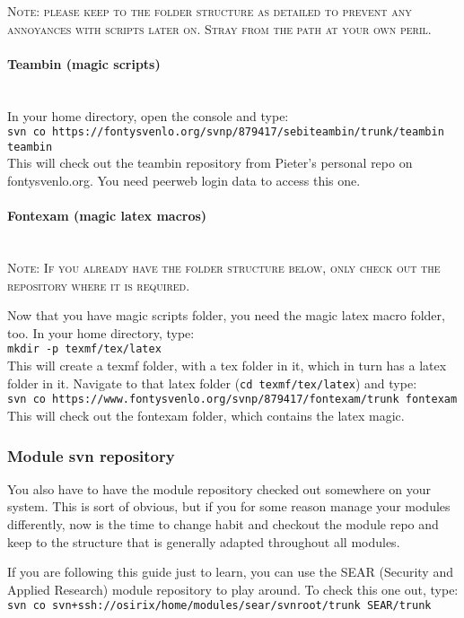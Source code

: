 \documentclass{article}
\begin{document}
\textsc{Note: please keep to the folder structure as detailed to prevent any annoyances with scripts later on. Stray from the path at your own peril.}

\paragraph{Teambin (magic scripts)}\mbox{}\\
In your home directory, open the console and type:\\
\verb|svn co https://fontysvenlo.org/svnp/879417/sebiteambin/trunk/teambin teambin|\\
This will check out the teambin repository from Pieter's personal repo on fontysvenlo.org. You need peerweb login data to access this one.

\paragraph{Fontexam (magic latex macros)}\mbox{}\\
\textsc{Note: If you already have the folder structure below, only check out the repository where it is required.}

Now that you have magic scripts folder, you need the magic latex macro folder, too. In your home directory, type:\\
\verb|mkdir -p texmf/tex/latex|\\
This will create a texmf folder, with a tex folder in it, which in turn has a latex folder in it. Navigate to that latex folder (\verb|cd texmf/tex/latex|) and type:\\
\verb|svn co https://www.fontysvenlo.org/svnp/879417/fontexam/trunk fontexam |\\
This will check out the fontexam folder, which contains the latex magic.
\subsubsection{Module svn repository}
You also have to have the module repository checked out somewhere on your system. This is sort of obvious, but if you for some reason manage your modules differently, now is the time to change habit and checkout the module repo and keep to the structure that is generally adapted throughout all modules.

If you are following this guide just to learn, you can use the SEAR (Security and Applied Research) module repository to play around.
To check this one out, type:\\
\verb|svn co svn+ssh://osirix/home/modules/sear/svnroot/trunk SEAR/trunk|\\
\end{document}
